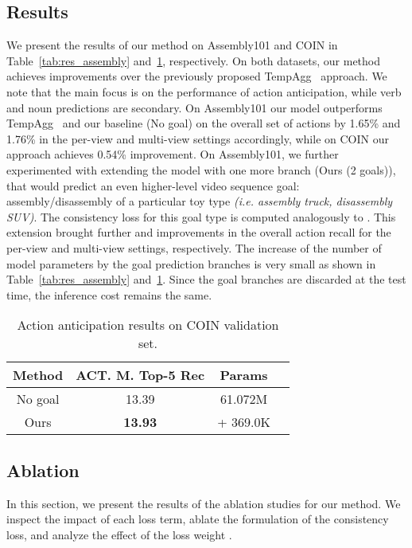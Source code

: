 \documentclass{article}
\begin{document}
\vspace{-0.25cm}
\subsection{Results}
\label{subsec:results}
\vspace{-0.1cm}
We present the results of our method on Assembly101 and COIN  in Table~\ref{tab:res_assembly} and~\ref{tab:res_coin}, respectively. On both datasets, our method achieves improvements over the previously proposed TempAgg~\cite{sener2022assembly101} approach. We note that the main focus is on the performance of action anticipation, while verb and noun predictions are secondary. On Assembly101 our model outperforms TempAgg~\cite{sener2022assembly101} and our baseline (No goal) on the overall set of actions by 1.65\% and 1.76\% in the per-view and multi-view settings accordingly, while on COIN our approach achieves 0.54\% improvement. On Assembly101, we further experimented with extending the model with one more branch (Ours (2 goals)), that would predict an even higher-level video sequence goal: assembly/disassembly of a particular toy type \textit{(i.e. assembly truck, disassembly SUV)}. The consistency loss for this goal type is computed analogously to . This extension brought further  and  improvements in the overall action recall for the per-view and multi-view settings, respectively. The increase of the number of model parameters by the goal prediction branches is very small as shown in Table~\ref{tab:res_assembly} and~\ref{tab:res_coin}. Since the goal branches are discarded at the test time, the inference cost remains the same.

\begin{table}[h!]
    \centering
    \scriptsize
    \begin{tabular}{|c|c|c|c|}
        \hline
         Method & ACT. M. Top-5 Rec & Params \\
         \hline
         No goal & 13.39 & 61.072M \\
         Ours & \textbf{13.93} & + 369.0K \\
        \hline
    \end{tabular}
    \caption{\small Action anticipation results on COIN validation set.}
    \label{tab:res_coin}
\end{table}
\vspace{-0.6cm}

\subsection{Ablation}
\vspace{-0.1cm}
In this section, we present the results of the ablation studies for our method. We inspect the impact of each loss term, ablate the formulation of the consistency loss, and analyze the effect of the loss weight .
\end{document}
